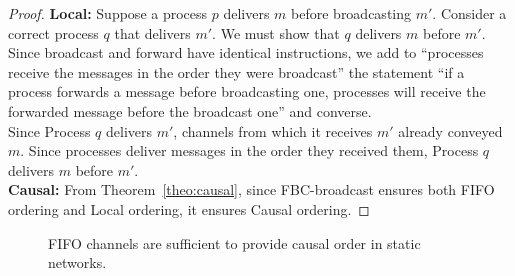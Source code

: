 \begin{proof}
  \textbf{Local:} Suppose a process $p$ delivers $m$ before broadcasting
  $m'$. Consider a correct process $q$ that delivers $m'$. We must show that $q$
  delivers $m$ before $m'$. \\
  Since broadcast and forward have identical instructions, we add to ``processes
  receive the messages in the order they were broadcast'' the statement ``if a
  process forwards a message before broadcasting one, processes will receive the
  forwarded message before the broadcast one'' and converse. \\
  Since Process $q$ delivers $m'$, channels from which it receives $m'$ already
  conveyed $m$. Since processes deliver messages in the order they received
  them, Process $q$ delivers $m$ before $m'$. \\
  \textbf{Causal:} From Theorem~\ref{theo:causal}, since FBC-broadcast ensures
  both FIFO ordering and Local ordering, it ensures Causal ordering.
\end{proof}


\begin{figure}
  \begin{center}
    
    \caption{\label{fig:static}FIFO channels are sufficient to provide causal
      order in static networks.}
  \end{center}
\end{figure}

